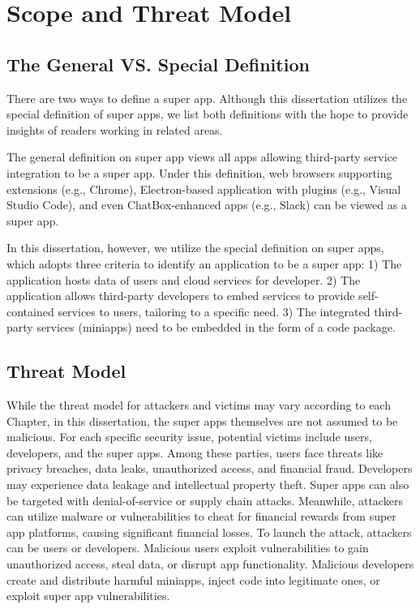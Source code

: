 \documentclass{osudissert96}
\renewcommand{\paragraph}[1]{\vspace{0.05in}\noindent{\bf{#1}.}}
\begin{document}
\section{Scope and Threat Model}
\subsection{The General VS. Special Definition}

There are two ways to define a super app. Although this dissertation utilizes the special definition of super apps, we list both definitions with the hope to provide insights of readers working in related areas.

\paragraph{The general definition} The general definition on super app views all apps allowing third-party service integration to be a super app. Under this definition, web browsers supporting extensions (e.g., Chrome), Electron-based application with plugins (e.g., Visual Studio Code), and even ChatBox-enhanced apps (e.g., Slack) can be viewed as a super app. 

\paragraph{The special definition} In this dissertation, however, we utilize  the special definition on super apps, which adopts three criteria to identify an application to be a super app:  1) The application hosts data of users and cloud services for developer. 2) The application allows third-party developers to embed services to provide self-contained services to users, tailoring to a specific need. 3) The integrated third-party services (miniapps) need to be embedded in the form of a code package.

\subsection{Threat Model}
While the threat model for attackers and victims may vary according to each Chapter, in this dissertation, the super apps themselves are not assumed to be malicious. For each specific security issue, potential victims include users, developers, and the super apps. Among these parties, users face threats like privacy breaches, data leaks, unauthorized access, and financial fraud. Developers may experience data leakage and intellectual property theft. Super apps can also be targeted with denial-of-service or supply chain attacks. Meanwhile, attackers can utilize malware or vulnerabilities to cheat for financial rewards from super app platforms, causing significant financial losses. To launch the attack, attackers can be users or developers. Malicious users exploit vulnerabilities to gain unauthorized access, steal data, or disrupt app functionality. Malicious developers create and distribute harmful miniapps, inject code into legitimate ones, or exploit super app vulnerabilities. 
\end{document}
